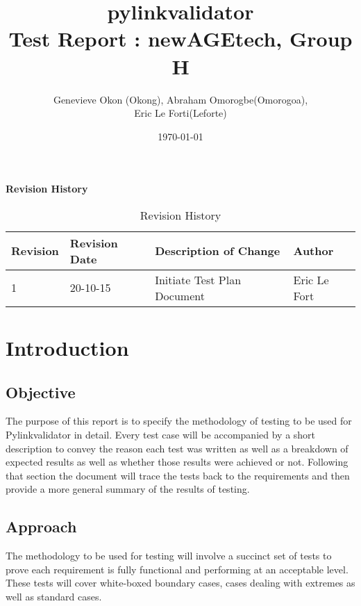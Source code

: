 \documentclass[12pt, titlepage]{article}
\begin{document}
\title{pylinkvalidator \\
 Test Report : newAGEtech, Group H }
\author{Genevieve Okon (Okong), Abraham Omorogbe(Omorogoa),\\
 Eric Le Forti(Leforte)}
\date{\today}
\maketitle

\tableofcontents
\pagebreak

\begin{center}\textbf{Revision History}\end{center}
\begin{table}[h!]
\centering
	\begin{tabular}{| p{1.5cm} | p{2.5cm} | p{7cm} |p{3cm} |}    \hline
	Revision  &Revision Date &Description of Change &Author\\ \hline
	1& 20-10-15 &Initiate Test Plan Document &Eric Le Fort\\ \hline
       \end{tabular}
       \caption{Revision History}
       \label{table:Revision History}
\end{table}

\listoftables
\listoffigures
\pagebreak



\section{Introduction}
\subsection{Objective}
The purpose of this report is to specify the methodology of testing to be used for Pylinkvalidator in detail. Every test case will be accompanied by a short description to convey the reason each test was written as well as a breakdown of expected results as well as whether those results were achieved or not. Following that section the document will trace the tests back to the requirements and then provide a more general summary of the results of testing.

\subsection{Approach}
The methodology to be used for testing will involve a succinct set of tests to prove each requirement is fully functional and performing at an acceptable level. These tests will cover white-boxed boundary cases, cases dealing with extremes as well as standard cases.\\
\end{document}
